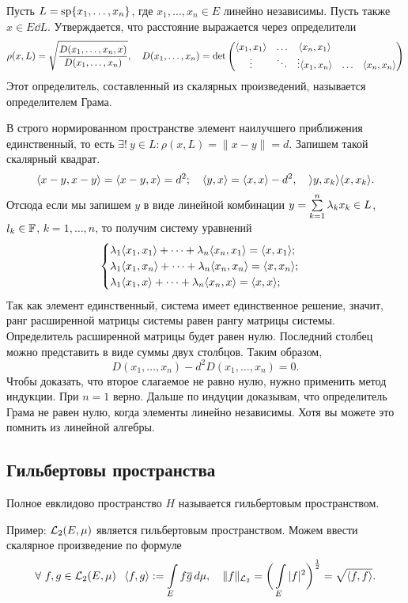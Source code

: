 \begin{The}
  Пусть $L = \operatorname{sp}\{x_1,\dots,x_n\}$, где $x_1,\dots,x_n\in E$ линейно независимы. Пусть также $x\in E\dd L$. Утверждается, что расстояние выражается через определители
\[
  \rho(x,L) = \sqrt{\frac{D(x_1,\dots,x_n,x)}{D(x_1,\dots,x_n)}},\quad
  D(x_1,\dots,x_n) = \det\begin{pmatrix}
   \langle x_1,x_1\rangle &\dots & \langle x_n,x_1\rangle\\
   \vdots & \ddots & \vdots
   \langle x_1,x_n\rangle &\dots & \langle x_n,x_n\rangle\\
\end{pmatrix}
\]
Этот определитель, составленный из скалярных произведений, называется определителем Грама.
\end{The}

\begin{Proof}
  В строго нормированном пространстве элемент наилучшего приближения единственный, то есть $\exists!\ y\in L\colon\rho(x,L) = \|x-y\|=d$. Запишем такой скалярный квадрат.
\[
  \langle x-y,x-y\rangle = \langle x-y,x\rangle = d^2;\quad \langle y,x\rangle = \langle x,x\rangle - d^2,\quad \rangle y,x_k\rangle \langle x,x_k\rangle.
\]
Отсюда если мы запишем $y$ в виде линейной комбинации $y = \sum\limits_{k = 1}^{n}\lambda_kx_k\in L$, $l_k\in\mathbb F$, $k=1,\dots,n$, то получим систему уравнений
\[
\begin{cases}
\l_1\la x_1,x_1\ra +\dots + \l_n\la x_n,x_1\ra = \la x,x_1\ra;\\
\dotfill
\l_1\la x_1,x_n\ra +\dots + \l_n\la x_n,x_n\ra = \la x,x_n\ra;\\
\l_1\la x_1,x\ra +\dots + \l_n\la x_n,x\ra = \la x,x\ra;\\
\end{cases}
\]
Так как элемент единственный, система имеет единственное решение, значит, ранг расширенной матрицы системы равен рангу матрицы системы. Определитель расширенной матрицы будет равен нулю. Последний столбец можно представить в виде суммы двух столбцов. Таким образом,
\[
  D(x_1,\dots,x_n)- d^2D(x_1,\dots,x_n) = 0.
\]
Чтобы доказать, что второе слагаемое не равно нулю, нужно применить метод индукции. При $n=1$ верно. Дальше по индуции доказывам, что определитель Грама не равен нулю, когда элементы линейно независимы. Хотя вы можете это помнить из линейной алгебры.
\end{Proof}

\subsection{Гильбертовы пространства}
\begin{Def}
  Полное евклидово пространство $H$ называется гильбертовым пространством.
\end{Def}
Пример: $\mathcal L_2(E,\mu)$ является гильбертовым пространством. Можем ввести скалярное произведение по формуле
\[
  \forall\ f,g\in \mathcal L_2(E,\mu)\hskip .75em plus.1em minus.08em\relax \langle f,g\rangle :=\int\limits_{E}f\overline{g}\,d\mu,\quad
                                     \|f\|_{\mathcal L_2} = \bigg(\int\limits_{E}{|f|^2}\bigg)^{\frac12} = \sqrt{\langle f,f\rangle}.
\]

